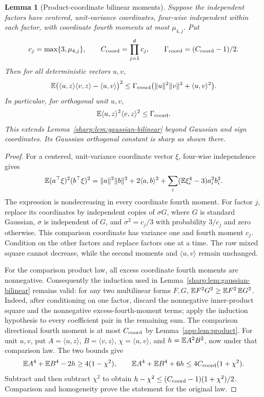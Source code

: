\documentclass[11pt,a4paper]{article}
\newtheorem{lemma}[theorem]{Lemma}
\theoremstyle{definition}\newtheorem{definition}[theorem]{Definition}
\theoremstyle{remark}\newtheorem{remark}[theorem]{Remark}
\numberwithin{equation}{section}
\newcommand{\norm}[1]{\lVert#1\rVert}\newcommand{\ip}[2]{\langle#1,#2\rangle}
\begin{document}
\begin{lemma}[Product-coordinate bilinear moments]
\label{app:lem:coordinate-cross}
Suppose the independent factors have centered, unit-variance coordinates,
four-wise independent within each factor, with coordinate fourth moments
at most $\mu_{4,j}$. Put
\[
 c_j=\max\{3,\mu_{4,j}\},\qquad C_{\rm coord}=\prod_{j=1}^d c_j,
 \qquad \Gamma_{\rm coord}=(C_{\rm coord}-1)/2.
\]
Then for all deterministic vectors $u,v$,
\begin{equation}\label{app:eq:coordinate-bilinear}
 \E\bigl(\ip uz\ip vz-\ip uv\bigr)^2
 \le\Gamma_{\rm coord}
       \bigl(\norm u^2\norm v^2+\ip uv^2\bigr).
\end{equation}
In particular, for orthogonal unit $u,v$,
\begin{equation}\label{app:eq:coordinate-cross}
 \E\ip uz^2\ip vz^2\le\Gamma_{\rm coord}.
\end{equation}
This extends Lemma~\ref{sharp:lem:gaussian-bilinear} beyond Gaussian
and sign coordinates. Its Gaussian orthogonal constant is sharp as
shown there.
\end{lemma}
\begin{proof}
For a centered, unit-variance coordinate vector $\xi$,
four-wise independence gives
\[
 \E(a^\top\xi)^2(b^\top\xi)^2
 =\norm a^2\norm b^2+2\ip ab^2
   +\sum_i(\E\xi_i^4-3)a_i^2b_i^2.
\]
The expression is nondecreasing in every coordinate fourth moment.
For factor $j$, replace its coordinates by independent copies of
$\sigma G$, where $G$ is standard Gaussian, $\sigma$ is independent
of $G$, and $\sigma^2=c_j/3$ with probability $3/c_j$ and zero
otherwise. This comparison coordinate has variance one and fourth
moment $c_j$. Condition on the other factors and replace factors
one at a time. The raw mixed square cannot decrease, while the
second moments and $\ip uv$ remain unchanged.

For the comparison product law, all excess coordinate fourth moments
are nonnegative. Consequently the induction used in
Lemma~\ref{sharp:lem:gaussian-bilinear} remains valid: for any two
multilinear forms $F,G$,
$\mathbb E F^2G^2\ge\mathbb E F^2\,\mathbb E G^2$. Indeed, after conditioning on one
factor, discard the nonnegative inner-product square and the
nonnegative excess-fourth-moment terms; apply the induction
hypothesis to every coefficient pair in the remaining sum.
The comparison directional fourth moment is at most $C_{\rm coord}$
by Lemma~\ref{app:lem:product}.
For unit $u,v$, put $A=\ip uz$, $B=\ip vz$, $\chi=\ip uv$, and
$h=\mathbb E A^2B^2$, now under that comparison law. The two bounds give
\[
 \mathbb E A^4+\mathbb E B^4-2h\ge4(1-\chi^2),\qquad
 \mathbb E A^4+\mathbb E B^4+6h\le4C_{\rm coord}(1+\chi^2).
\]
Subtract and then subtract $\chi^2$ to obtain
$h-\chi^2\le(C_{\rm coord}-1)(1+\chi^2)/2$.
Comparison and homogeneity prove the statement for the original law.
\end{proof}
\end{document}
